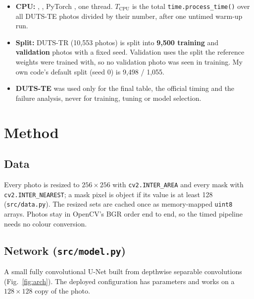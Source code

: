 \documentclass[11pt,a4paper]{article}
\begin{document}
\begin{itemize}
  \item \textbf{CPU:} \CPUName, \OSName, PyTorch \TorchVersion, one thread.
        $T_\text{CPU}$ is the total \texttt{time.process\_time()} over all \TcpuN{} DUTS-TE photos divided by their number,
        after one untimed warm-up run.
  \item \textbf{Split:} DUTS-TR (10,553 photos) is split into \textbf{9,500 training} and \textbf{\ValN{} validation}
        photos with a fixed seed. Validation uses the split the reference weights were trained with, so no
        validation photo was seen in training. My own code's default split (seed 0) is 9,498 / 1,055.
  \item \textbf{DUTS-TE} was used only for the final table, the official timing and the failure analysis,
        never for training, tuning or model selection.
\end{itemize}

\section{Method}
\subsection{Data}
Every photo is resized to $256\times256$ with \texttt{cv2.INTER\_AREA} and every mask with
\texttt{cv2.INTER\_NEAREST}; a mask pixel is object if its value is at least 128 (\texttt{src/data.py}).
The resized sets are cached once as memory-mapped \texttt{uint8} arrays. Photos stay in OpenCV's BGR order end
to end, so the timed pipeline needs no colour conversion.

\subsection{Network (\texttt{src/model.py})}
A small fully convolutional U-Net built from depthwise separable convolutions (Fig.~\ref{fig:arch}).
The deployed configuration has \NParams{} parameters and works on a $128\times128$ copy of the photo.
\end{document}
